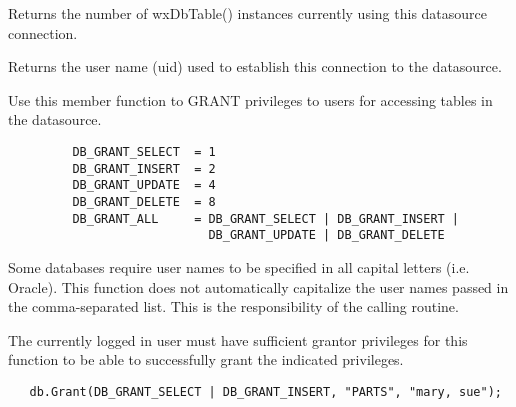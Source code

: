 Returns the number of wxDbTable() instances currently using this datasource connection.


\label{wxdbgetusername}


Returns the user name (uid) used to establish this connection to the datasource.


\label{wxdbgrant}


Use this member function to GRANT privileges to users for accessing tables in the datasource.



\begin{verbatim}
         DB_GRANT_SELECT  = 1
         DB_GRANT_INSERT  = 2
         DB_GRANT_UPDATE  = 4
         DB_GRANT_DELETE  = 8
         DB_GRANT_ALL     = DB_GRANT_SELECT | DB_GRANT_INSERT |
                            DB_GRANT_UPDATE | DB_GRANT_DELETE
\end{verbatim}



Some databases require user names to be specified in all capital letters (i.e. Oracle).  This function does not automatically capitalize the user names passed in the comma-separated list.  This is the responsibility of the calling routine.

The currently logged in user must have sufficient grantor privileges for this 
function to be able to successfully grant the indicated privileges.


\begin{verbatim}
   db.Grant(DB_GRANT_SELECT | DB_GRANT_INSERT, "PARTS", "mary, sue");
\end{verbatim}


